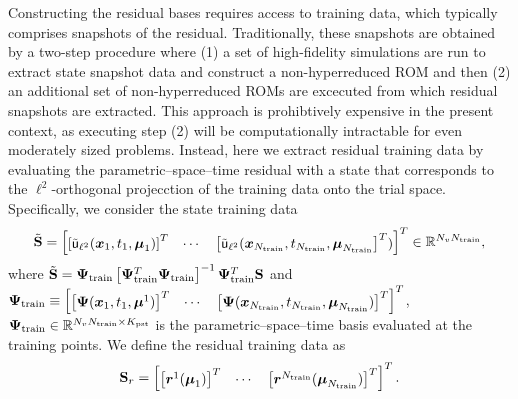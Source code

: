 \documentclass[3p,computermodern,10pt]{elsarticle}
\begin{document}
Constructing the residual bases requires access to training data, which typically comprises snapshots of the residual. Traditionally, these snapshots are obtained by a two-step procedure where (1) a set of high-fidelity simulations are run to extract state snapshot data and construct a non-hyperreduced ROM and then (2) an additional set of non-hyperreduced ROMs are excecuted from which residual snapshots are extracted. This approach is prohibtively expensive in the present context, as executing step (2) will be computationally intractable for even moderately sized problems. Instead, here we extract residual training data by evaluating the parametric--space--time residual with a state that corresponds to the $\ell^2$-orthogonal projecction of the training data onto the trial space. Specifically, we consider the state training data
$$\tilde{\mathbf{S}} = \begin{bmatrix} \left[\tilde{\mathsf{u}}_{\ell^2}(\boldsymbol x_1,t_1,\boldsymbol \mu_1)\right]^T & \cdots &  \left[\tilde{\mathsf{u}}_{\ell^2}(\boldsymbol x_{N_{\text{train}}},t_{N_{\text{train}}},\boldsymbol \mu_{N_{\text{train}}}\right]^T )\end{bmatrix}^T \in \mathbb{R}^{N_v  N_{\text{train}}},$$
where $\tilde{\mathbf{S}} = \mathbf{\Psi}_{\text{train}}  \left[ \mathbf{\Psi}_{\text{train}}^T \mathbf{\Psi}_{\text{train}}\right]^{-1} \mathbf{\Psi}_{\text{train}}^T\mathbf{S}$ and $\mathbf{\Psi}_{\text{train}} \equiv \begin{bmatrix} \left[ \boldsymbol \Psi(\boldsymbol x_1,t_1,\boldsymbol \mu^1)\right]^T & \cdots & \left[\boldsymbol \Psi(\boldsymbol x_{N_{\text{train}}},t_{N_{\text{train}}},\boldsymbol \mu_{N_{\text{train}}}) \right]^T \end{bmatrix}^T$, $\mathbf{\Psi}_{\text{train}}  \in \mathbb{R}^{N_v N_{\text{train}} \times K_{\text{pst}}}$ is the parametric--space--time basis evaluated at the training points. We define the residual training data as 
$$ \mathbf{S}_r = \begin{bmatrix}\left[ \boldsymbol{r}^1(\boldsymbol \mu_1) \right]^T & \cdots & \left[ \boldsymbol{r}^{N_{\text{train}}}(\boldsymbol \mu_{N_{\text{train}}}) \right]^T \end{bmatrix}^T.$$

\end{document}
